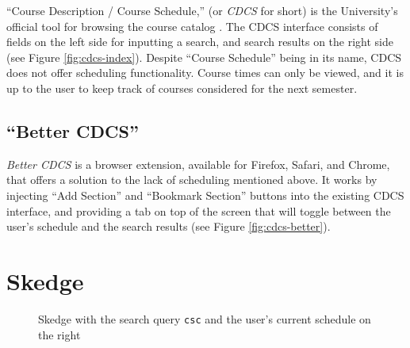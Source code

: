 ``Course Description / Course Schedule,'' (or \emph{CDCS} for short) is the University's official tool for browsing the course catalog \cite{cdcs}. The CDCS interface consists of fields on the left side for inputting a search, and search results on the right side (see Figure \ref{fig:cdcs-index}). Despite ``Course Schedule'' being in its name, CDCS does not offer scheduling functionality. Course times can only be viewed, and it is up to the user to keep track of courses considered for the next semester.

\subsection{``Better CDCS''}

\emph{Better CDCS} \cite{better-cdcs} is a browser extension, available for Firefox, Safari, and Chrome, that offers a solution to the lack of scheduling mentioned above. It works by injecting ``Add Section'' and ``Bookmark Section'' buttons into the existing CDCS interface, and providing a tab on top of the screen that will toggle between the user's schedule and the search results (see Figure \ref{fig:cdcs-better}).


\section{Skedge}

\begin{figure}[H]
    \centering
    \caption[Skedge with the search query {\tt csc}]{Skedge with the search query {\tt csc} and the user's current schedule on the right}
    \label{fig:sk-index}
\end{figure}

